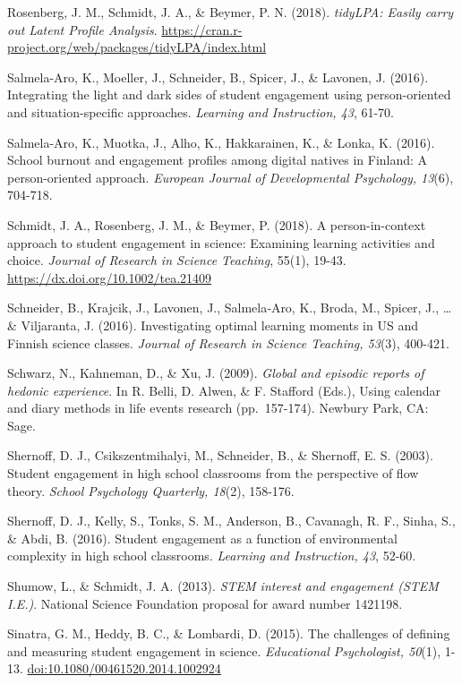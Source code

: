\documentclass[]{msu-thesis}
\theoremstyle{definition}
\theoremstyle{definition}
\theoremstyle{definition}
\theoremstyle{remark}
\begin{document}
Rosenberg, J. M., Schmidt, J. A., \& Beymer, P. N. (2018).
\emph{tidyLPA: Easily carry out Latent Profile Analysis}.
\url{https://cran.r-project.org/web/packages/tidyLPA/index.html}

Salmela-Aro, K., Moeller, J., Schneider, B., Spicer, J., \& Lavonen, J.
(2016). Integrating the light and dark sides of student engagement using
person-oriented and situation-specific approaches. \emph{Learning and
Instruction, 43}, 61-70.

Salmela-Aro, K., Muotka, J., Alho, K., Hakkarainen, K., \& Lonka, K.
(2016). School burnout and engagement profiles among digital natives in
Finland: A person-oriented approach. \emph{European Journal of
Developmental Psychology, 13}(6), 704-718.

Schmidt, J. A., Rosenberg, J. M., \& Beymer, P. (2018). A
person-in-context approach to student engagement in science: Examining
learning activities and choice. \emph{Journal of Research in Science
Teaching}, 55(1), 19-43. \url{https://dx.doi.org/10.1002/tea.21409}

Schneider, B., Krajcik, J., Lavonen, J., Salmela‐Aro, K., Broda, M.,
Spicer, J., \ldots{} \& Viljaranta, J. (2016). Investigating optimal
learning moments in US and Finnish science classes. \emph{Journal of
Research in Science Teaching, 53}(3), 400-421.

Schwarz, N., Kahneman, D., \& Xu, J. (2009). \emph{Global and episodic
reports of hedonic experience}. In R. Belli, D. Alwen, \& F. Stafford
(Eds.), Using calendar and diary methods in life events research
(pp.~157-174). Newbury Park, CA: Sage.

Shernoff, D. J., Csikszentmihalyi, M., Schneider, B., \& Shernoff, E. S.
(2003). Student engagement in high school classrooms from the
perspective of flow theory. \emph{School Psychology Quarterly, 18}(2),
158-176.

Shernoff, D. J., Kelly, S., Tonks, S. M., Anderson, B., Cavanagh, R. F.,
Sinha, S., \& Abdi, B. (2016). Student engagement as a function of
environmental complexity in high school classrooms. \emph{Learning and
Instruction, 43}, 52-60.

Shumow, L., \& Schmidt, J. A. (2013). \emph{STEM interest and engagement
(STEM I.E.)}. National Science Foundation proposal for award number
1421198.

Sinatra, G. M., Heddy, B. C., \& Lombardi, D. (2015). The challenges of
defining and measuring student engagement in science. \emph{Educational
Psychologist, 50}(1), 1-13. \url{doi:10.1080/00461520.2014.1002924}
\end{document}
